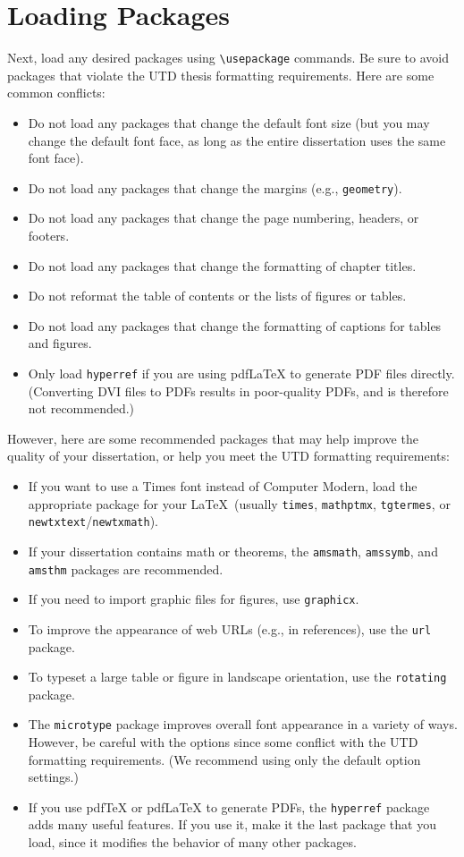 \documentclass[doublespacing]{utdthesis}
\begin{document}
\section{Loading Packages}
\label{s:packages}

Next, load any desired packages using \verb|\usepackage| commands.
Be sure to avoid packages that violate the UTD thesis formatting requirements.
Here are some common conflicts:
\begin{itemize}
\item Do not load any packages that change the default font size
 (but you may change the default font face, as long as the entire dissertation
 uses the same font face).
\item Do not load any packages that change the margins
 (e.g., \texttt{geometry}).
\item Do not load any packages that change the page numbering, headers,
 or footers.
\item Do not load any packages that change the formatting of chapter titles.
\item Do not reformat the table of contents or the lists of figures or tables.
\item Do not load any packages that change the formatting of captions for
 tables and figures.
\item Only load \texttt{hyperref} if you are using pdf\LaTeX{} to generate PDF
 files directly.
 (Converting DVI files to PDFs results in poor-quality PDFs, and is therefore
 not recommended.)

\end{itemize}

However, here are some recommended packages that may help improve the quality
of your dissertation, or help you meet the UTD formatting requirements:
\begin{itemize}
\item If you want to use a Times font instead of Computer Modern, load the
 appropriate package for your \LaTeX\ (usually
 \texttt{times}, \texttt{mathptmx}, \texttt{tgtermes}, or
 \texttt{newtxtext}/\texttt{newtxmath}).
\item If your dissertation contains math or theorems, the \texttt{amsmath},
 \texttt{amssymb}, and \texttt{amsthm} packages are recommended.
\item If you need to import graphic files for figures, use \texttt{graphicx}.
\item To improve the appearance of web URLs (e.g., in references), use the
 \texttt{url} package.
\item To typeset a large table or figure in landscape orientation, use the
 \texttt{rotating} package.
\item The \texttt{microtype} package improves overall font appearance in a
 variety of ways.
 However, be careful with the options since some conflict with the UTD
 formatting requirements.
 (We recommend using only the default option settings.)
\item If you use pdf\TeX{} or pdf\LaTeX{} to generate PDFs, the
 \texttt{hyperref} package adds many useful features.
 If you use it, make it the last package that you load, since it modifies the
 behavior of many other packages.
\end{itemize}
\end{document}
